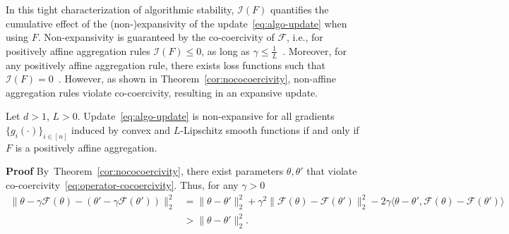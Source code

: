 \documentclass[twoside,11pt]{article}
\newcommand{\F}{\mathcal{F}}
\begin{document}
\noindent 
In this tight characterization of algorithmic stability, $\mathcal{I}(F)$ quantifies the cumulative effect of the (non-)expansivity of the update~\eqref{eq:algo-update} when using $F$.
Non-expansivity is guaranteed by the co-coercivity of $\F$, i.e., for positively affine aggregation rules $\mathcal{I}(F) \leq 0$, as long as $\gamma \leq \frac{1}{L}$~\citep[Lemma 3.6]{hardt2016train}.
Moreover, for any positively affine aggregation rule, there exists loss functions such that $\mathcal{I}(F)=0$~\citep[cf.][Theorem 1, or the proof of Theorem~\ref{cor:unavoidable-instability}]{pmlr-v180-zhang22b}.  
However, as shown in Theorem~\ref{cor:nococoercivity}, non-affine aggregation rules violate co-coercivity, resulting in an expansive update.
\begin{corollary}\label{cor:expansivity}
    Let $d>1$, $L>0$. Update~\eqref{eq:algo-update} is non-expansive for all gradients $\{g_i(\cdot)\}_{i\in[n]}$ induced by convex and $L$-Lipschitz smooth functions if and only if $F$ is a positively affine aggregation.
\end{corollary}
\textbf{Proof}\;
    By~Theorem~\ref{cor:nococoercivity}, there exist parameters $\theta, \theta'$ that violate co-coercivity~\eqref{eq:operator-cocoercivity}. 
    Thus, for any $\gamma > 0$
    \begin{align*}
        \| \theta - \gamma \F(\theta) - (\theta' - \gamma \F(\theta')) \|_2^2 
        &= \| \theta - \theta' \|_2^2
        + \gamma^2 \| \F(\theta) - \F(\theta') \|_2^2
        - 2 \gamma \langle \theta - \theta', \F(\theta) - \F(\theta') \rangle \\
        &> \| \theta - \theta' \|_2^2. \tag*{\BlackBox}
    \end{align*}
\end{document}
